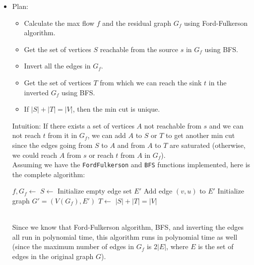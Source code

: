 \documentclass{article}
\begin{document}
\begin{itemize}
    \item[(c)] Plan:
    \begin{itemize}
      \item Calculate the max flow $f$ and the residual graph $G_f$ using Ford-Fulkerson algorithm.
      \item Get the set of vertices $S$ reachable from the source $s$ in $G_f$ using BFS.
      \item Invert all the edges in $G_f$.
      \item Get the set of vertices $T$ from which we can reach the sink $t$ in the inverted $G_f$ using BFS.
      \item If $|S| + |T| = |V|$, then the min cut is unique.
    \end{itemize}
    Intuition: If there exists a set of vertices $A$ not reachable from $s$ and we can not reach $t$ from it in $G_f$, we can add $A$ to $S$ or $T$ to get another min cut since the edges going from $S$ to $A$ and from $A$ to $T$ are saturated (otherwise, we could reach $A$ from $s$ or reach $t$ from $A$ in $G_f$). \\
    Assuming we have the \texttt{FordFulkerson} and \texttt{BFS} functions implemented, here is the complete algorithm:
    \begin{algorithm}
      \caption{Unique Min Cut}
      \begin{algorithmic}[1]
          \State $f, G_f \gets$ 
          \State $S \gets$ 
          \State Initialize empty edge set $E'$
           
            \State Add edge $(v, u)$ to $E'$
          \EndFor
          \State Initialize graph $G' = (V(G_f), E')$ 
          \State $T \gets$ 
          \State \Return $|S| + |T| = |V|$ 
        \EndFunction
      \end{algorithmic}
    \end{algorithm} \\
    Since we know that Ford-Fulkerson algorithm, BFS, and inverting the edges all run in polynomial time, this algorithm runs in polynomial time as well (since the maximum number of edges in $G_f$ is $2|E|$, where $E$ is the set of edges in the original graph $G$).
  \end{itemize}
\end{document}
